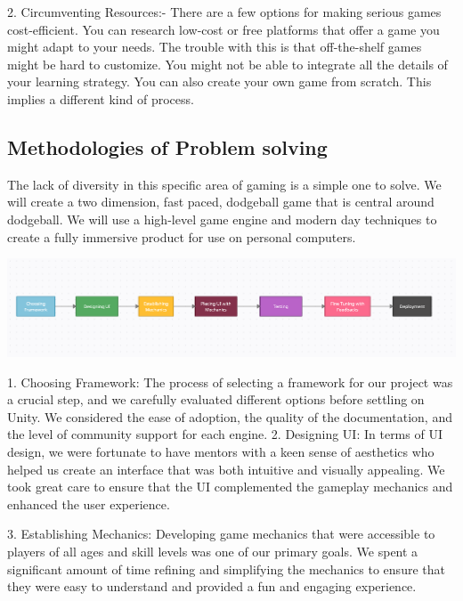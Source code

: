 \documentclass[12pt]{report}
\begin{document}
2. Circumventing Resources:- There are a few options for making serious games cost-efficient. You can research low-cost or free platforms that offer a game you might adapt to your needs. The trouble with this is that off-the-shelf games might be hard to customize. You might not be able to integrate all the details of your learning strategy. You can also create your own game from scratch. This implies a different kind of process. 

\raggedright
\subsection{Methodologies of Problem solving }
\justifying
\setlength{\parindent}{2em}
\setlength{\parskip}{0.5em}
\renewcommand{\baselinestretch}{1.5}
\normalsize \hspace{1.7cm}The lack of diversity in this specific area of gaming is a simple one to solve. We will create a two
dimension, fast paced, dodgeball game that is central around dodgeball. We will use a high-level game engine and modern day techniques to create a fully immersive product for use on personal computers.

\begin{center}
   \includegraphics[scale=0.5]{SDLC.png}
\end{center}
\newpage

1.	Choosing Framework: The process of selecting a framework for our project was a crucial step, and we carefully evaluated different options before settling on Unity. We considered the ease of adoption, the quality of the documentation, and the level of community support for each engine.
2.	Designing UI: In terms of UI design, we were fortunate to have mentors with a keen sense of aesthetics who helped us create an interface that was both intuitive and visually appealing. We took great care to ensure that the UI complemented the gameplay mechanics and enhanced the user experience.

3.	Establishing Mechanics: Developing game mechanics that were accessible to players of all ages and skill levels was one of our primary goals. We spent a significant amount of time refining and simplifying the mechanics to ensure that they were easy to understand and provided a fun and engaging experience.
\end{document}
